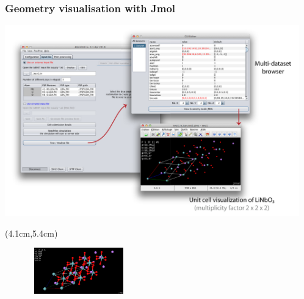 \begin{frame}
 \frametitle{Geometry visualisation with Jmol}
 \centering
 \includegraphics[height=8.25cm]{f3}
 \begin{textblock*}{8cm}(4.1cm,5.4cm)
  \begin{figure}
  \includegraphics[height=2cm,width=4.3cm]{image-linux}
  \end{figure}
 \end{textblock*}

\end{frame}

